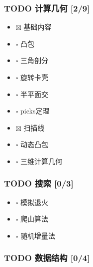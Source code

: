 \documentclass[11pt]{article}
\begin{document}
\subsubsection{{\bfseries\sffamily TODO} 计算几何 [2/9]}
\label{sec:org3fb9a41}

\begin{itemize}
\item $\boxtimes$ 基础内容
\item $\square$ 凸包
\item $\square$ 三角剖分
\item $\square$ 旋转卡壳
\item $\square$ 半平面交
\item $\square$ picks定理
\item $\boxtimes$ 扫描线
\item $\square$ 动态凸包
\item $\square$ 三维计算几何
\end{itemize}

\subsubsection{{\bfseries\sffamily TODO} 搜索 [0/3]}
\label{sec:orgb8991fe}

\begin{itemize}
\item $\square$ 模拟退火
\item $\square$ 爬山算法
\item $\square$ 随机增量法
\end{itemize}

\subsubsection{{\bfseries\sffamily TODO} 数据结构 [0/4]}
\label{sec:org7335670}
\end{document}
